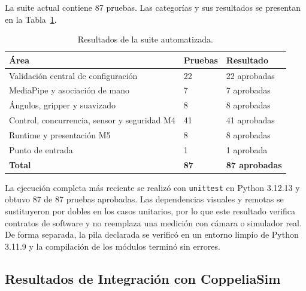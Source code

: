 La suite actual contiene 87 pruebas. Las categorías y sus resultados se
presentan en la Tabla~\ref{tab:resultados_automatizados}.

\begin{table}[H]
    \centering
    \renewcommand{\arraystretch}{1.2}
    \begin{tabularx}{\textwidth}{X p{2.2cm} p{3cm}}
        \toprule
        \textbf{Área} & \textbf{Pruebas} & \textbf{Resultado} \\
        \midrule
        Validación central de configuración & 22 & 22 aprobadas \\
        MediaPipe y asociación de mano & 7 & 7 aprobadas \\
        Ángulos, gripper y suavizado & 8 & 8 aprobadas \\
        Control, concurrencia, sensor y seguridad M4 & 41 & 41 aprobadas \\
        Runtime y presentación M5 & 8 & 8 aprobadas \\
        Punto de entrada & 1 & 1 aprobada \\
        \midrule
        \textbf{Total} & \textbf{87} & \textbf{87 aprobadas} \\
        \bottomrule
    \end{tabularx}
    \caption{Resultados de la suite automatizada.}
    \label{tab:resultados_automatizados}
\end{table}

La ejecución completa más reciente se realizó con \texttt{unittest} en
Python 3.12.13 y obtuvo 87 de 87 pruebas aprobadas. Las dependencias visuales
y remotas se sustituyeron por dobles en los casos unitarios, por lo que este
resultado verifica contratos de software y no reemplaza una medición con
cámara o simulador real. De forma separada, la pila declarada se verificó en
un entorno limpio de Python 3.11.9 y la compilación de los módulos terminó sin
errores.

\subsection{Resultados de Integración con CoppeliaSim}
\label{subsec:resultados_integracion}

